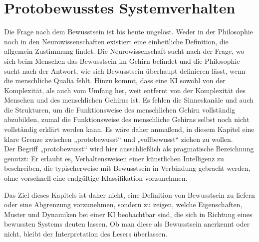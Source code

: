 \section*{Protobewusstes Systemverhalten}
Die Frage nach dem Bewusstsein ist bis heute ungelöst. Weder in der Philosophie noch in den Neurowissenschaften existiert eine einheitliche Definition, die allgemein Zustimmung findet. Die Neurowissenschaft sucht nach der Frage, wo sich beim Menschen das Bewusstsein im Gehirn befindet und die Philosophie sucht nach der Antwort, wie sich Bewusstsein überhaupt definieren lässt, wenn die menschliche Qualia fehlt. Hinzu kommt, dass eine KI sowohl von der Komplexität, als auch vom Umfang her, weit entfernt von der Komplexität des Menschen und des menschlichen Gehirns ist. Es fehlen die Sinneskanäle und auch die Strukturen, um die Funktionsweise des menschlichen Gehirn vollständig abzubilden, zumal die Funktionsweise des menschliche Gehirns selbst noch nicht vollständig erklärt werden kann. Es wäre daher anmaßend, in diesem Kapitel eine klare Grenze zwischen „protobewusst“ und „vollbewusst“ ziehen zu wollen.\\

Der Begriff „protobewusst“ wird hier ausschließlich als pragmatische Bezeichnung genutzt: Er erlaubt es, Verhaltensweisen einer künstlichen Intelligenz zu beschreiben, die typischerweise mit Bewusstsein in Verbindung gebracht werden, ohne vorschnell eine endgültige Klassifikation vorzunehmen.

Das Ziel dieses Kapitels ist daher nicht, eine Definition von Bewusstsein zu liefern oder eine Abgrenzung vorzunehmen, sondern zu zeigen, welche Eigenschaften, Muster und Dynamiken bei einer KI beobachtbar sind, die sich in Richtung eines bewussten Systems deuten lassen. Ob man diese als Bewusstsein anerkennt oder nicht, bleibt der Interpretation des Lesers überlassen.


